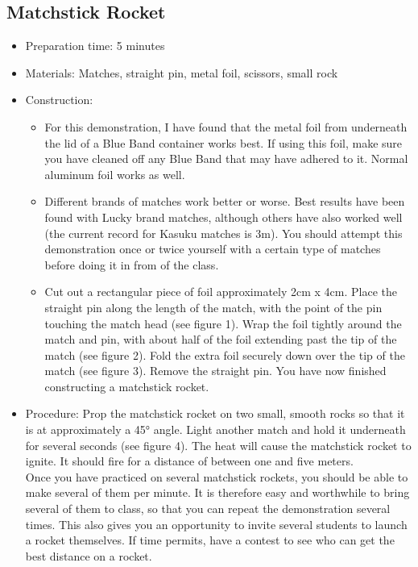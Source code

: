 \subsection{Matchstick Rocket}
\begin{itemize}
\item{Preparation time: 5 minutes}
\item{Materials: Matches, straight pin, metal foil, scissors, small rock}
\item{Construction:
\begin{itemize}
\item{For this demonstration, I have found that the metal foil from underneath the lid of a Blue Band container works best. If using this foil, make sure you have cleaned off any Blue Band that may have adhered to it. Normal aluminum foil works as well.}
\item{Different brands of matches work better or worse. Best results have been found with Lucky brand matches, although others have also worked well (the current record for Kasuku matches is 3m). You should attempt this demonstration once or twice yourself with a certain type of matches before doing it in from of the class.}
\item{Cut out a rectangular piece of foil approximately 2cm x 4cm. Place the straight pin along the length of the match, with the point of the pin touching the match head (see figure 1). Wrap the foil tightly around the match and pin, with about half of the foil extending past the tip of the match (see figure 2). Fold the extra foil securely down over the tip of the match (see figure 3). Remove the straight pin. You have now finished constructing a matchstick rocket.}
\end{itemize}
} %
\item{Procedure: Prop the matchstick rocket on two small, smooth rocks so that it is at approximately a 45° angle. Light another match and hold it underneath for several seconds (see figure 4). The heat will cause the matchstick rocket to ignite. It should fire for a distance of between one and five meters.\\
Once you have practiced on several matchstick rockets, you should be able to make several of them per minute. It is therefore easy and worthwhile to bring several of them to class, so that you can repeat the demonstration several times. This also gives you an opportunity to invite several students to launch a rocket themselves. If time permits, have a contest to see who can get the best distance on a rocket.}

\end{itemize}
